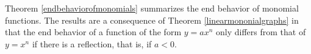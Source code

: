 \documentclass{ximera}
\begin{document}




Theorem \ref{endbehaviorofmonomials} summarizes the end behavior of monomial functions.  The results are a consequence of Theorem \ref{linearmononialgraphs} in that the end behavior of a function of the form $y = ax^n$  only differs from that of  $y = x^n$ if there is a reflection, that is, if $a<0$.    



\end{document}
